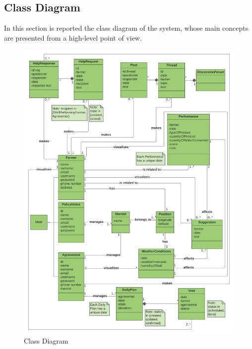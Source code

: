 \subsection{Class Diagram}

In this section is reported the class diagram of the system, whose main concepts are presented from a high-level point of view. 
\begin{figure}[H]
  \includegraphics[width=125.5mm,scale=0.9]{./Images/Class Diagram DREAM.png}
  \caption{Class Diagram}
\end{figure}

\newpage


